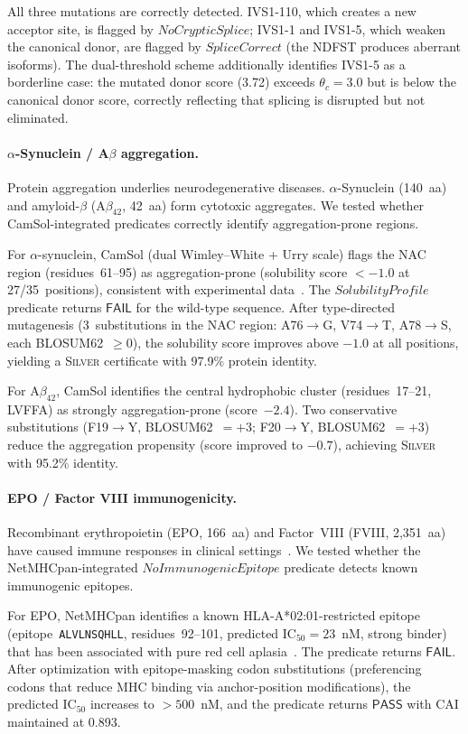 \documentclass[acmsmall,review,anonymous]{acmart}
\newcommand{\PASS}{\ensuremath{\mathsf{PASS}}\xspace}
\newcommand{\FAIL}{\ensuremath{\mathsf{FAIL}}\xspace}
\newcommand{\SILVER}{\textsc{Silver}\xspace}
\begin{document}
All three mutations are correctly detected.  IVS1-110, which creates a
new acceptor site, is flagged by $\mathit{NoCrypticSplice}$; IVS1-1 and
IVS1-5, which weaken the canonical donor, are flagged by
$\mathit{SpliceCorrect}$ (the NDFST produces aberrant isoforms).  The
dual-threshold scheme additionally identifies IVS1-5 as a borderline
case: the mutated donor score (3.72) exceeds $\theta_c = 3.0$ but is
below the canonical donor score, correctly reflecting that splicing is
disrupted but not eliminated.

\paragraph{$\alpha$-Synuclein / A$\beta$ aggregation.}
Protein aggregation underlies neurodegenerative diseases.
$\alpha$-Synuclein (140~aa) and amyloid-$\beta$ (A$\beta_{42}$, 42~aa)
form cytotoxic aggregates.  We tested whether CamSol-integrated
predicates correctly identify aggregation-prone regions.

For $\alpha$-synuclein, CamSol (dual Wimley--White + Urry scale) flags
the NAC region (residues~61--95) as aggregation-prone (solubility score
$< -1.0$ at 27/35~positions), consistent with experimental
data~\cite{giasson2002nacfibrillization}.  The
$\mathit{SolubilityProfile}$ predicate returns \FAIL{} for the wild-type
sequence.  After type-directed mutagenesis (3~substitutions in the NAC
region: A76$\to$G, V74$\to$T, A78$\to$S, each BLOSUM62~$\ge 0$), the
solubility score improves above $-1.0$ at all positions, yielding a
\SILVER{} certificate with 97.9\% protein identity.

For A$\beta_{42}$, CamSol identifies the central hydrophobic cluster
(residues~17--21, LVFFA) as strongly aggregation-prone (score~$-2.4$).
Two conservative substitutions (F19$\to$Y, BLOSUM62~$= +3$; F20$\to$Y,
BLOSUM62~$= +3$) reduce the aggregation propensity (score improved to
$-0.7$), achieving \SILVER{} with 95.2\% identity.

\paragraph{EPO / Factor VIII immunogenicity.}
Recombinant erythropoietin (EPO, 166~aa) and Factor~VIII (FVIII,
2,351~aa) have caused immune responses in clinical
settings~\cite{casadevall2002epo,geigert2014immunogenicity}.  We tested
whether the NetMHCpan-integrated $\mathit{NoImmunogenicEpitope}$
predicate detects known immunogenic epitopes.

For EPO, NetMHCpan identifies a known HLA-A*02:01-restricted epitope
(epitope~\texttt{ALVLNSQHLL}, residues~92--101, predicted
IC$_{50} = 23$~nM, strong binder) that has been associated with
pure red cell aplasia~\cite{casadevall2002epo}.  The predicate returns
\FAIL.  After optimization with epitope-masking codon substitutions
(preferencing codons that reduce MHC binding via anchor-position
modifications), the predicted IC$_{50}$ increases to $> 500$~nM, and
the predicate returns \PASS{} with CAI maintained at 0.893.
\end{document}
